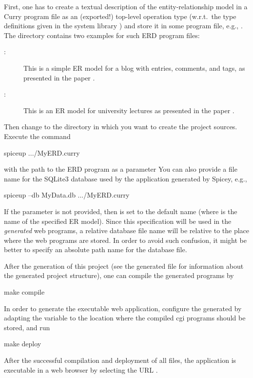 First, one has to create a textual description of the
entity-relationship model
in a Curry program file as an (exported!) top-level operation type 
(w.r.t.\ the type definitions given in the system library
)
and store it in some program file, e.g., .
The directory 
contains two examples for such ERD program files:
\begin{description}
\item[:]
This is a simple ER model for a blog with entries, comments,
and tags, as presented in the paper \cite{HanusKoschnicke14TPLP}.
\item[:]
This is an ER model for university lectures as
presented in the paper \cite{BrasselHanusMueller08PADL}.
\end{description}
%
Then change to the directory in which you want to create
the project sources.
Execute the command
\begin{curry}
spiceup .../MyERD.curry
\end{curry}
with the path to the ERD program as a parameter
You can also provide a file name for the SQLite3 database used
by the application generated by Spicey, e.g.,
\begin{curry}
spiceup --db MyData.db .../MyERD.curry
\end{curry}
If the parameter  is not provided,
then  is set to the default name 
(where  is the name of the specified ER model).
Since this specification will be used in the \emph{generated} web programs,
a relative database file name will be relative to the place where
the web programs are stored.
In order to avoid such confusion, it might be better to specify
an absolute path name for the database file.

After the generation of this project (see the generated file
 for information about the generated project structure),
one can compile the generated programs by
\begin{curry}
make compile
\end{curry}
In order to generate the executable web application,
configure the generated 
by adapting the variable  to the location
where the compiled cgi programs should be stored, and run
\begin{curry}
make deploy
\end{curry}
After the successful compilation and deployment of all files,
the application is executable
in a web browser by selecting the URL .
